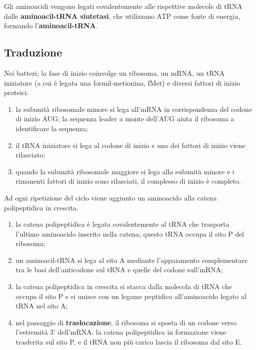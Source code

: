 Gli aminoacidi vengono legati covalentemente alle rispettive molecole di tRNA dalle \textbf{aminoacil-tRNA sintetasi}, che utilizzano ATP come fonte di energia, formando l'\textbf{aminoacil-tRNA}.

\subsection{Traduzione}

Nei batteri, la fase di inizio coinvolge un ribosoma, un mRNA, un tRNA iniziatore (a cui è legata una formil-metionina, fMet) e diversi fattori di inizio proteici.
\begin{enumerate}
  \item la subunità ribosomale minore si lega all'mRNA in corrispondenza del codone di inizio AUG; la sequenza leader a monte dell'AUG aiuta il ribosoma a identificare la sequenza;
  \item il tRNA iniziatore si lega al codone di inizio e uno dei fattori di inizio viene rilasciato;
  \item quando la subunità ribosomale maggiore si lega alla subunità minore e i rimanenti fattori di inizio sono rilasciati, il complesso di inizio è completo.
\end{enumerate}

Ad ogni ripetizione del ciclo viene aggiunto un aminoacido alla catena polipeptidica in crescita.
\begin{enumerate}
  \item la catena polipeptidica è legata covalentemente al tRNA che trasporta l'ultimo aminoacido inserito nella catena; questo tRNA occupa il sito P del ribosoma;
  \item un aminoacil-tRNA si lega al sito A mediante l'appaiamento complementare tra le basi dell'anticodone sul tRNA e quelle del codone sull'mRNA;
  \item la catena polipeptidica in crescita si stacca dalla molecola di tRNA che occupa il sito P e si unisce con un legame peptidico all'aminoacido legato al tRNA nel sito A;
  \item nel passaggio di \textbf{traslocazione}, il ribosoma si sposta di un codone verso l'estremità 3' dell'mRNA: la catena polipeptidica in formazione viene trasferita sul sito P, e il tRNA non più carico lascia il ribosoma dal sito E.
\end{enumerate}

